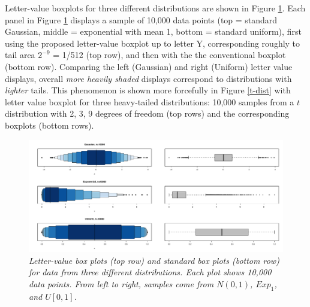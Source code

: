 \documentclass[oneside]{article}
\begin{document}
Letter-value boxplots for three different distributions are 
shown in Figure \ref{stackbox}. 
Each panel in Figure \ref{stackbox} displays a sample of 10,000 
data points (top = standard Gaussian, middle = exponential 
with mean 1, bottom = standard uniform),
first using the proposed letter-value boxplot
up to letter Y, corresponding roughly to tail area $2^{-9}$
= 1/512 (top row), and then with the
the conventional boxplot (bottom row).
Comparing the left (Gaussian) and right (Uniform) letter
value displays, overall \textit{more heavily shaded} displays 
correspond to distributions with \textit{lighter} tails.  
This phenomenon is shown more forcefully in 
Figure \ref{t-dist} with letter value boxplot for three heavy-tailed
distributions: 10,000 samples from a $t$ distribution with 2, 3, 9
degrees of freedom (top rows) and the corresponding boxplots
(bottom rows).

\begin{figure}[hbt]
\begin{center}
\includegraphics[scale=.5,angle=270]{boxplots}
\caption{\it \label{stackbox} Letter-value box plots (top row) and standard 
box plots (bottom row) for data from three different distributions. Each plot 
shows 10,000 data points.  From left to right, samples come from 
$N(0,1)$, $Exp_1$, and $U[0,1]$. }
\end{center}
\end{figure}
\end{document}
